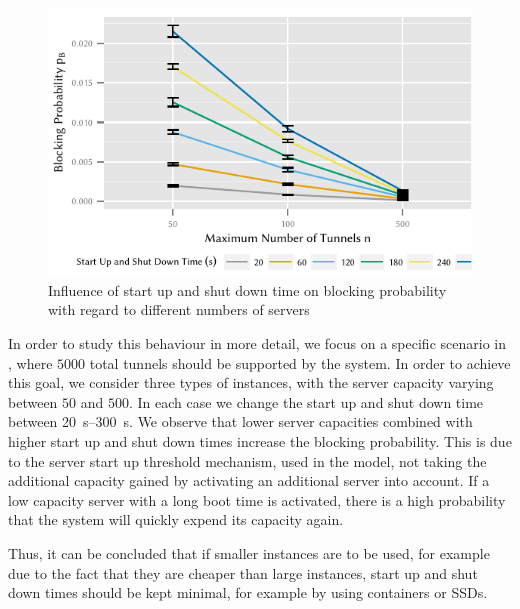 \begin{figure}
  \centering
  \includegraphics{cloud/virtualized_network_functions/performance_evaluation/figures/compare_maxinstances_block}
  \caption{Influence of start up and shut down time on blocking probability with regard to different numbers of servers}
  \label{fig:cloud_virtualized_network_functions:startup_shutdown:compare_maxinstances_block}
\end{figure}
 
In order to study this behaviour in more detail, we focus on a specific scenario in , where \(5000\) total tunnels should be supported by the system.
In order to achieve this goal, we consider three types of instances, with the server capacity varying between \(50\) and \(500\).
In each case we change the start up and shut down time between \SIrange{20}{300}{\second}.
We observe that lower server capacities combined with higher start up and shut down times increase the blocking probability.
This is due to the server start up threshold mechanism, used in the model, not taking the additional capacity gained by activating an additional server into account.
If a low capacity server with a long boot time is activated, there is a high probability that the system will quickly expend its capacity again.

Thus, it can be concluded that if smaller instances are to be used, for example due to the fact that they are cheaper than large instances, start up and shut down times should be kept minimal, for example by using containers or \glspl{SSD}.